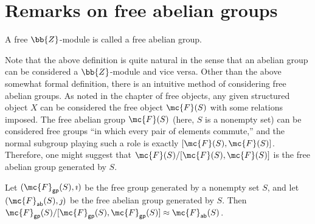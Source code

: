 \section{Remarks on free abelian groups}

\begin{defi}
    A free $\bb{Z}$-module is called a free abelian group.
\end{defi}

Note that the above definition is quite natural in the sense that an abelian group can be considered a $\bb{Z}$-module and vice versa.
Other than the above somewhat formal definition, there is an intuitive method of considering free abelian groups.
As noted in the chapter of free objects, any given structured object $X$ can be considered the free object $\mc{F}(S)$ with some relations imposed.
The free abelian group $\mc{F}(S)$ (here, $S$ is a nonempty set) can be considered free groups ``in which every pair of elements commute,'' and the normal subgroup playing such a role is exactly $[\mc{F}(S), \mc{F}(S)]$.
Therefore, one might suggest that $\mc{F}(S)/[\mc{F}(S), \mc{F}(S)]$ is the free abelian group generated by $S$.
\begin{thm}
    Let $(\mc{F}_\textsf{gp}(S), \imath)$ be the free group generated by a nonempty set $S$, and let $(\mc{F}_\textsf{ab}(S), \jmath)$ be the free abelian group generated by $S$.
    Then $\mc{F}_\textsf{gp}(S)/[\mc{F}_\textsf{gp}(S), \mc{F}_\textsf{gp}(S)]\approx \mc{F}_\textsf{ab}(S)$.
\end{thm}
